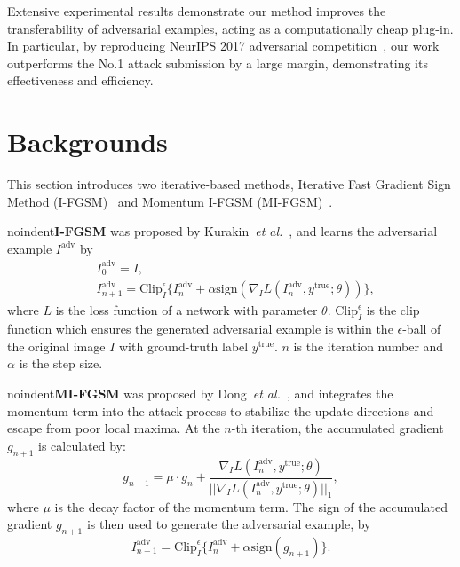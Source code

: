 \documentclass[letterpaper]{article} %
\def\etal{\emph{et al.}}
\begin{document}
Extensive experimental results demonstrate our method improves the transferability of adversarial examples, acting as a computationally cheap plug-in. In particular, by reproducing NeurIPS 2017 adversarial competition~\cite{kurakin2018adversarial}, our work outperforms the No.1 attack submission by a large margin, demonstrating its effectiveness and efficiency.

\section{Backgrounds} \label{sec:related work}
This section introduces two iterative-based methods, Iterative Fast Gradient Sign Method (I-FGSM)~\cite{kurakin2016adversarial} and Momentum I-FGSM (MI-FGSM)~\cite{dong2017boosting}.



noindent\textbf{I-FGSM} was proposed by Kurakin~\etal~\cite{kurakin2016adversarial}, and learns the adversarial example $I^{\text{adv}}$ by%
\begin{equation} \label{eq:IFGSM update}
\begin{split}
&I_{0}^{\text{adv}} = I, \\
&I_{n+1}^{\text{adv}} = \text{Clip}_{I}^{\epsilon} \{I_{n}^{\text{adv}} + \alpha\text{sign}\left(\nabla_{I} L(I_{n}^{\text{adv}}, y^{\text{true}}; \theta)\right)\},
\end{split}
\end{equation}
where $L$ is the loss function of a network with parameter $\theta$. $\text{Clip}_{I}^{\epsilon}$ is the clip function which ensures the generated adversarial example is within the $\epsilon$-ball of the original image $I$ with ground-truth label $y^{\text{true}}$. $n$ is the iteration number and $\alpha$ is the step size.

noindent\textbf{MI-FGSM} was proposed by Dong~\etal~\cite{dong2017boosting}, and integrates the momentum term into the attack process to stabilize the update directions and escape from poor local maxima. At the $n$-th iteration, the accumulated gradient $g_{n+1}$ is calculated by:%
\begin{equation} \label{eq: momentum term}
g_{n+1} = \mu \cdot g_n + \frac{\nabla_{I} L(I_{n}^{\text{adv}}, y^{\text{true}}; \theta)}{||\nabla_{I} L(I_{n}^{\text{adv}}, y^{\text{true}}; \theta)||_1},
\end{equation}
where $\mu$ is the decay factor of the momentum term. The sign of the accumulated gradient $g_{n+1}$ is then used to generate the adversarial example, by
\begin{equation}
I_{n+1}^{\text{adv}} = \text{Clip}_{I}^{\epsilon}\{I_{n}^{\text{adv}} + \alpha\text{sign}(g_{n+1})\}.
\end{equation}
\end{document}
